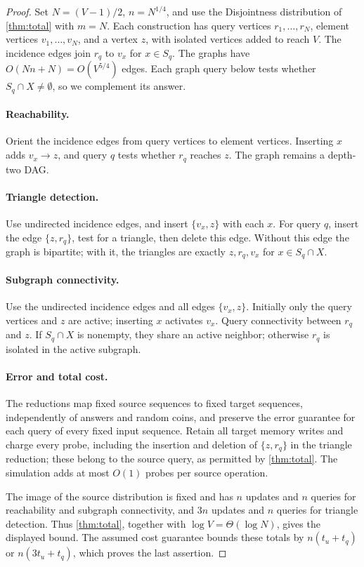 \documentclass[11pt]{article}
\theoremstyle{plain}
\begin{document}
\begin{proof}
Set $N=(V-1)/2$, $n=N^{1/4}$, and
use the Disjointness distribution of \cref{thm:total} with $m=N$.
Each construction has query vertices $r_1,\ldots,r_N$, element vertices
$v_1,\ldots,v_N$, and a vertex $z$, with isolated vertices added to
reach $V$. The incidence edges join $r_q$ to $v_x$ for $x\in S_q$.
The graphs have $O(Nn+N)=O(V^{5/4})$ edges. Each graph query below
tests whether $S_q\cap X\ne\emptyset$, so we complement its answer.

\paragraph{Reachability.}
Orient the incidence edges from query vertices to element vertices. Inserting $x$ adds
$v_x\to z$, and query $q$ tests whether $r_q$ reaches $z$.
The graph remains a depth-two DAG.

\paragraph{Triangle detection.}
Use undirected incidence edges, and insert $\{v_x,z\}$ with each $x$.
For query $q$, insert the edge $\{z,r_q\}$, test for a triangle,
then delete this edge. Without this edge the graph is bipartite;
with it, the triangles are exactly $z,r_q,v_x$ for $x\in S_q\cap X$.

\paragraph{Subgraph connectivity.}
Use the undirected incidence edges and all edges $\{v_x,z\}$.
Initially only the query vertices and $z$ are active; inserting $x$ activates
$v_x$. Query connectivity between $r_q$ and $z$. If $S_q\cap X$ is
nonempty, they share an active neighbor; otherwise $r_q$ is isolated
in the active subgraph.

\paragraph{Error and total cost.}
The reductions map fixed source sequences to fixed target sequences,
independently of answers and random coins, and preserve the error guarantee for each query of every fixed input sequence. Retain all target memory writes and charge every probe,
including the insertion and deletion of $\{z,r_q\}$ in the triangle reduction; these belong
to the source query, as permitted by \cref{thm:total}. The simulation
adds at most $O(1)$ probes per source operation.

The image of the source distribution is fixed and has $n$ updates and
$n$ queries for reachability and subgraph connectivity, and $3n$ updates
and $n$ queries for triangle detection. Thus \cref{thm:total}, together
with $\log V=\Theta(\log N)$, gives the displayed bound. The assumed
cost guarantee bounds these totals by $n(t_u+t_q)$ or $n(3t_u+t_q)$,
which proves the last assertion.
\end{proof}
\end{document}
